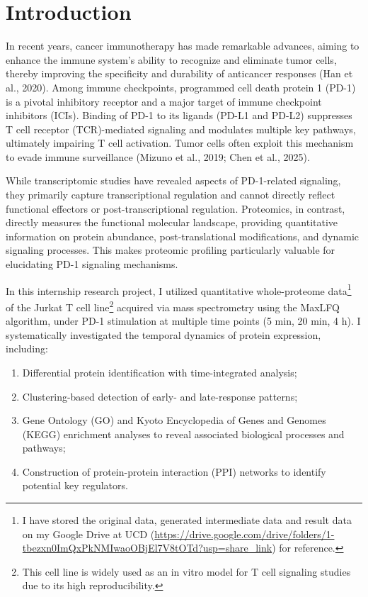 \documentclass{article}
\begin{document}
  \section{Introduction}

    In recent years, cancer immunotherapy has made remarkable advances, aiming to enhance the immune system's ability to recognize and eliminate tumor cells, thereby improving the specificity and durability of anticancer responses (Han et al., 2020). Among immune checkpoints, programmed cell death protein 1 (PD-1) is a pivotal inhibitory receptor and a major target of immune checkpoint inhibitors (ICIs). Binding of PD-1 to its ligands (PD-L1 and PD-L2) suppresses T cell receptor (TCR)-mediated signaling and modulates multiple key pathways, ultimately impairing T cell activation. Tumor cells often exploit this mechanism to evade immune surveillance (Mizuno et al., 2019; Chen et al., 2025).

    While transcriptomic studies have revealed aspects of PD-1-related signaling, they primarily capture transcriptional regulation and cannot directly reflect functional effectors or post-transcriptional regulation. Proteomics, in contrast, directly measures the functional molecular landscape, providing quantitative information on protein abundance, post-translational modifications, and dynamic signaling processes. This makes proteomic profiling particularly valuable for elucidating PD-1 signaling mechanisms.

    In this internship research project, I utilized quantitative whole-proteome data\footnote{I have stored the original data, generated intermediate data and result data on my Google Drive at UCD (\url{https://drive.google.com/drive/folders/1-tbezxn0ImQxPkNMIwaoOBjEl7V8tOTd?usp=share_link}) for reference.} of the Jurkat T cell line\footnote{This cell line is widely used as an in vitro model for T cell signaling studies due to its high reproducibility.} acquired via mass spectrometry using the MaxLFQ algorithm, under PD-1 stimulation at multiple time points (5 min, 20 min, 4 h). I systematically investigated the temporal dynamics of protein expression, including: 
    \begin{enumerate}
      \item Differential protein identification with time-integrated analysis; 
      \item Clustering-based detection of early- and late-response patterns; 
      \item Gene Ontology (GO) and Kyoto Encyclopedia of Genes and Genomes (KEGG) enrichment analyses to reveal associated biological processes and pathways; 
      \item Construction of protein-protein interaction (PPI) networks to identify potential key regulators.
    \end{enumerate}
\end{document}
